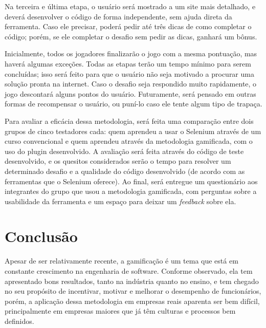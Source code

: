 \documentclass[twoside,english,brazilian]{UNISINOSartigo}
\begin{document}
Na terceira e última etapa, o usuário será mostrado a um site mais detalhado, e deverá desenvolver o código de forma independente, sem ajuda direta da ferramenta. Caso ele precisar, poderá pedir até três dicas de como completar o código; porém, se ele completar o desafio sem pedir as dicas, ganhará um bônus.

Inicialmente, todos os jogadores finalizarão o jogo com a mesma pontuação, mas haverá algumas exceções. Todas as etapas terão um tempo mínimo para serem concluídas; isso será feito para que o usuário não seja motivado a procurar uma solução pronta na internet. Caso o desafio seja respondido muito rapidamente, o jogo descontará alguns pontos do usuário. Futuramente, será pensado em outras formas de recompensar o usuário, ou puní-lo caso ele tente algum tipo de trapaça.

Para avaliar a eficácia dessa metodologia, será feita uma comparação entre dois grupos de cinco testadores cada: quem aprendeu a usar o Selenium através de um curso convencional e quem aprendeu através da metodologia gamificada, com o uso do plugin desenvolvido. A avaliação será feita através do código de teste desenvolvido, e os quesitos considerados serão o tempo para resolver um determinado desafio e a qualidade do código desenvolvido (de acordo com as ferramentas que o Selenium oferece). Ao final, será entregue um questionário aos integrantes do grupo que usou a metodologia gamificada, com perguntas sobre a usabilidade da ferramenta e um espaço para deixar um \textit{feedback} sobre ela.



\section{Conclusão}
Apesar de ser relativamente recente, a gamificação é um tema que está em constante crescimento na engenharia de software. Conforme observado, ela tem apresentado bons resultados, tanto na indústria quanto no ensino, e tem chegado no seu propósito de incentivar, motivar e melhorar o desempenho de funcionários, porém, a aplicação dessa metodologia em empresas reais aparenta ser bem difícil, principalmente em empresas maiores que já têm culturas e processos bem definidos. 
\end{document}
